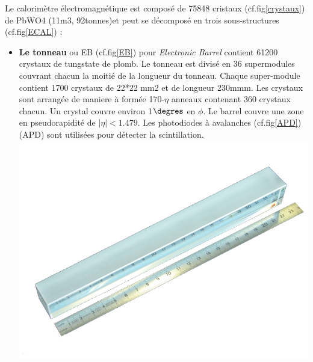 Le calorimètre électromagnétique est composé de 75848 cristaux (cf.fig\ref{crystaux}) de PbWO4 (11m3, 92tonnes)et peut se décomposé en trois sous-structures (cf.fig\ref{ECAL}) :
\begin{itemize}[label=$\bullet$]
	\item \textbf{Le tonneau} ou EB (cf.fig\ref{EB}) pour \textit{Electronic Barrel} contient 61200 crystaux de tungstate de plomb. Le tonneau est divisé en 36 supermodules couvrant chacun la moitié de la longueur du tonneau. Chaque super-module contient 1700 crystaux de 22*22 mm2 et de longueur 230mmm. Les crystaux sont arrangée de maniere à formée 170-$\eta$ anneaux contenant 360 crystaux chacun. Un crystal couvre environ 1$\degres$ en $\phi$. Le barrel couvre une zone en pseudorapidité de $|\eta|<1.479$. Les photodiodes à avalanches (cf.fig\ref{APD}) (APD) sont utilisées pour détecter la scintillation.
	\marginpar
	{
		\centering
		\includegraphics[width=\marginparwidth]{CMS/Crystaux.png}
		\label{crystaux}
	}
	

\end{itemize}
